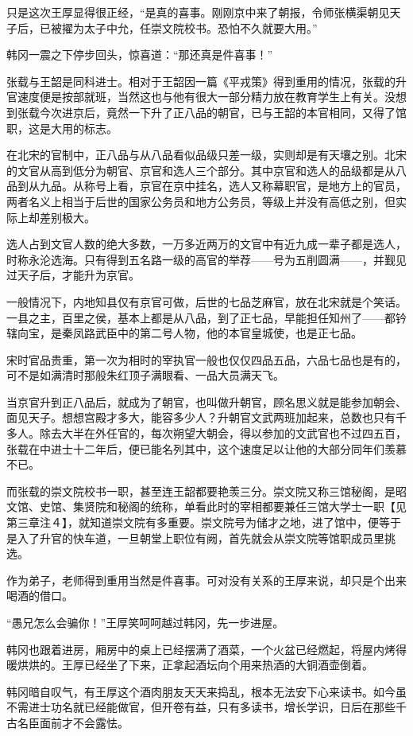 只是这次王厚显得很正经，“是真的喜事。刚刚京中来了朝报，令师张横渠朝见天子后，已被擢为太子中允，任崇文院校书。恐怕不久就要大用。”

韩冈一震之下停步回头，惊喜道：“那还真是件喜事！”

张载与王韶是同科进士。相对于王韶因一篇《平戎策》得到重用的情况，张载的升官速度便是按部就班，当然这也与他有很大一部分精力放在教育学生上有关。没想到张载今次进京后，竟然一下升了正八品的朝官，已与王韶的本官相同，又得了馆职，这是大用的标志。

在北宋的官制中，正八品与从八品看似品级只差一级，实则却是有天壤之别。北宋的文官从高到低分为朝官、京官和选人三个部分。其中京官和选人的品级都是从八品到从九品。从称号上看，京官在京中挂名，选人又称幕职官，是地方上的官员，两者名义上相当于后世的国家公务员和地方公务员，等级上并没有高低之别，但实际上却差别极大。

选人占到文官人数的绝大多数，一万多近两万的文官中有近九成一辈子都是选人，时称永沦选海。只有得到五名路一级的高官的举荐——号为五削圆满——，并觐见过天子后，才能升为京官。

一般情况下，内地知县仅有京官可做，后世的七品芝麻官，放在北宋就是个笑话。一县之主，百里之侯，基本上都是从八品，到了正七品，早能担任知州了——都钤辖向宝，是秦凤路武臣中的第二号人物，他的本官皇城使，也是正七品。

宋时官品贵重，第一次为相时的宰执官一般也仅仅四品五品，六品七品也是有的，可不是如满清时那般朱红顶子满眼看、一品大员满天飞。

当京官升到正八品后，就成为了朝官，也叫做升朝官，顾名思义就是能参加朝会、面见天子。想想宫殿才多大，能容多少人？升朝官文武两班加起来，总数也只有千多人。除去大半在外任官的，每次朔望大朝会，得以参加的文武官也不过四五百，张载在中进士十二年后，便已能名列其中，这个速度足以让他的大部分同年们羡慕不已。

而张载的崇文院校书一职，甚至连王韶都要艳羡三分。崇文院又称三馆秘阁，是昭文馆、史馆、集贤院和秘阁的统称，单看此时的宰相都要兼任三馆大学士一职【见第三章注４】，就知道崇文院有多重要。崇文院号为储才之地，进了馆中，便等于是入了升官的快车道，一旦朝堂上职位有阙，首先就会从崇文院等馆职成员里挑选。

作为弟子，老师得到重用当然是件喜事。可对没有关系的王厚来说，却只是个出来喝酒的借口。

“愚兄怎么会骗你！”王厚笑呵呵越过韩冈，先一步进屋。

韩冈也跟着进房，厢房中的桌上已经摆满了酒菜，一个火盆已经燃起，将屋内烤得暖烘烘的。王厚已经坐了下来，正拿起酒坛向个用来热酒的大铜酒壶倒着。

韩冈暗自叹气，有王厚这个酒肉朋友天天来捣乱，根本无法安下心来读书。如今虽不需进士功名就已经能做官，但开卷有益，只有多读书，增长学识，日后在那些千古名臣面前才不会露怯。

